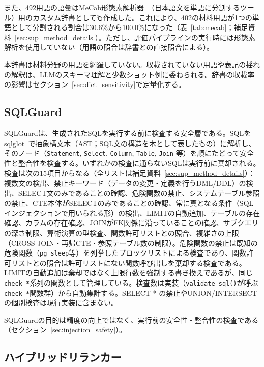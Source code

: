 \documentclass[twocolumn]{interact}
\begin{document}
また、492用語の語彙はMeCab形態素解析器~\cite{kudo2004mecab}（日本語文を単語に分割するツール）用のカスタム辞書としても作成した。これにより、402の材料用語が1つの単語として分割される割合は30.6\%から100.0\%になった（表~\ref{tab:mecab}；補足資料~\ref{sec:sup_method_details}）。ただし、評価パイプラインの実行時には形態素解析を使用していない（用語の照合は辞書との直接照合による）。

本辞書は材料分野の用語を網羅していない。収載されていない用語や表記の揺れの解釈は、LLMのスキーマ理解と少数ショット例に委ねられる。辞書の収載率の影響はセクション~\ref{sec:dict_sensitivity}で定量化する。
\subsection{SQLGuard}
\label{sec:sqlguard}

SQLGuardは、生成されたSQLを実行する前に検査する安全層である。SQLをsqlglot~\cite{sqlglot2023}で抽象構文木（AST；SQL文の構造を木として表したもの）に解析し、そのノード（\texttt{Statement}, \texttt{Select}, \texttt{Column}, \texttt{Table}, \texttt{Join} 等）を順にたどって安全性と整合性を検査する。いずれかの検査に通らないSQLは実行前に棄却される。検査は次の15項目からなる（全リストは補足資料~\ref{sec:sup_method_details}）：複数文の検出、禁止キーワード（データの変更・定義を行うDML/DDL）の検出、SELECT文のみであることの確認、危険関数の禁止、システムテーブル参照の禁止、CTE本体がSELECTのみであることの確認、常に真となる条件（SQLインジェクションで用いられる形）の検出、LIMITの自動追加、テーブルの存在確認、カラムの存在確認、JOINがFK関係に沿っていることの確認、サブクエリの深さ制限、算術演算の型検査、関数許可リストとの照合、複雑さの上限（CROSS JOIN・再帰CTE・参照テーブル数の制限）。危険関数の禁止は既知の危険関数（\texttt{pg\_sleep}等）を列挙したブロックリストによる検査であり、関数許可リストとの照合は許可リストにない関数呼び出しを棄却する検査である。LIMITの自動追加は棄却ではなく上限行数を強制する書き換えであるが、同じ\texttt{check\_*}系列の関数として管理している。検査数は実装（\texttt{validate\_sql()}が呼ぶ\texttt{check\_*}関数群）から自動集計する。SELECT * の禁止やUNION/INTERSECTの個別検査は現行実装に含まない。

SQLGuardの目的は精度の向上ではなく、実行前の安全性・整合性の検査である（セクション~\ref{sec:injection_safety}）。

\subsection{ハイブリッドリランカー}
\label{sec:reranker}
\end{document}
